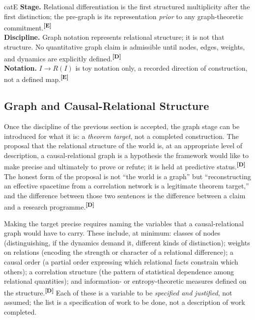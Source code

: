 \documentclass[12pt,a4paper,twoside]{article}
\theoremstyle{plain}
\theoremstyle{definition}
\theoremstyle{remark}
\newcommand{\catmark}[1]{\textsuperscript{\textsf{\textbf{[#1]}}}}
\begin{document}
\begin{evidencebox}{catE}
\textbf{Stage.} Relational differentiation is the first structured multiplicity after the first distinction; the pre-graph is its representation \emph{prior} to
any graph-theoretic commitment.\catmark{E}\\[0.3em]
\textbf{Discipline.} Graph notation represents relational structure; it is not that structure. No quantitative graph claim is admissible until nodes, edges,
weights, and dynamics are explicitly defined.\catmark{D}\\[0.3em]
\textbf{Notation.} $I \to R(I)$ is toy notation only, a recorded direction of construction, not a defined map.\catmark{E}
\end{evidencebox}

\subsection{Graph and Causal-Relational Structure}
\label{subsec:graph-causal}

Once the discipline of the previous section is accepted, the graph stage can be introduced for what it is: a \emph{theorem target}, not a completed construction. The proposal that the relational structure of the world is, at an appropriate level of description, a causal-relational graph is a hypothesis the framework would like to make precise and ultimately to prove or refute; it is held at predictive status.\catmark{D} The honest form of the proposal is not ``the world is a graph'' but ``reconstructing an effective spacetime from a correlation network is a legitimate theorem target,'' and the difference between those two sentences is the difference between a claim and a research programme.\catmark{D}

Making the target precise requires naming the variables that a causal-relational graph would have to carry. These include, at minimum: classes of nodes (distinguishing, if the dynamics demand it, different kinds of distinction); weights on relations (encoding the strength or character of a relational difference); a causal order (a partial order expressing which relational facts constrain which others); a correlation structure (the pattern of statistical dependence among relational quantities); and information- or entropy-theoretic measures defined on the structure.\catmark{D} Each of these is a variable to be \emph{specified and justified}, not assumed; the list is a specification of work to be done, not a description of work completed.
\end{document}

